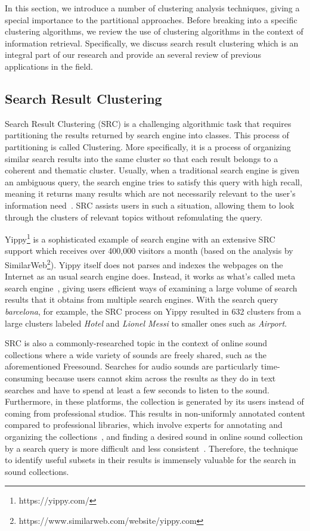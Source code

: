 In this section, we introduce a number of clustering analysis techniques, giving a special importance to the partitional approaches. Before breaking into a specific clustering algorithms, we review the use of clustering algorithms in the context of information retrieval. Specifically, we discuss search result clustering which is an integral part of our research and provide an several review of previous applications in the field.

\subsection{Search Result Clustering}
Search Result Clustering (SRC) is a challenging algorithmic task that requires partitioning the results returned by search engine into classes. This process of partitioning is called Clustering. More specifically, it is a process of organizing similar search results into the same cluster so that each result belongs to a coherent and thematic cluster. Usually, when a traditional search engine is given an ambiguous query, the search engine tries to satisfy this query with high recall, meaning it returns many results which are not necessarily relevant to the user's information need~\cite{ugo2012}. SRC assists users in such a situation, allowing them to look through the clusters of relevant topics without refomulating the query.

Yippy\footnote{https://yippy.com/} is a sophisticated example of search engine with an extensive SRC support which receives over 400,000 visitors a month (based on the analysis by SimilarWeb\footnote{https://www.similarweb.com/website/yippy.com}). Yippy itself does not parses and indexes the webpages on the Internet as an usual search engine does. Instead, it works as what's called meta search engine~\cite{glover2000}, giving users efficient ways of examining a large volume of search results that it obtains from multiple search engines. With the search query \textit{barcelona}, for example, the SRC process on Yippy resulted in 632 clusters from a large clusters labeled \textit{Hotel} and \textit{Lionel Messi} to smaller ones such as \textit{Airport}.

SRC is also a commonly-researched topic in the context of online sound collections where a wide variety of sounds are freely shared, such as the aforementioned Freesound. Searches for audio sounds are particularly time-consuming because users cannot skim across the results as they do in text searches and have to spend at least a few seconds to listen to the sound. Furthermore, in these platforms, the collection is generated by its users instead of coming from professional studios. This results in non-uniformly annotated content compared to professional libraries, which involve experts for annotating and organizing the collections~\cite{frederic2013}, and finding a desired sound in online sound collection by a search query is more difficult and less consistent~\cite{xavier2020}.
Therefore, the technique to identify useful subsets in their results is immensely valuable for the search in sound collections. 

